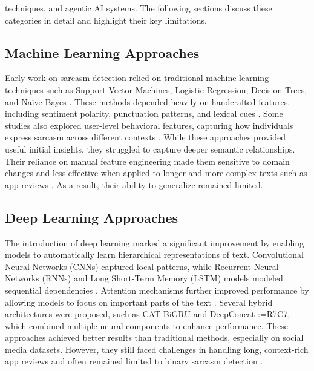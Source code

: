 \documentclass[a4paper,fleqn]{cas-sc}
\makeatletter
\newif\iftracked
\newcommand{\rv@recordone}[1]{%
  \edef\rv@i{#1}%
  \ifcsdef{rv@n@\rv@i}{}{\csgdef{rv@n@\rv@i}{0}}%
  \csxdef{rv@n@\rv@i}{\the\numexpr\csuse{rv@n@\rv@i}+1\relax}%
  \begingroup\edef\@currentlabel{\rv@i}\label{rv:\rv@i:\csuse{rv@n@\rv@i}}\endgroup}
\newcommand{\rv@record}[1]{\@for\rv@id:=#1\do{\expandafter\rv@recordone\expandafter{\rv@id}}}
\DeclareRobustCommand{\rce}[1]{\rv@record{R7C7}\iftracked{\color{rvEdit}#1}\else#1\fi}
\makeatother
\begin{document}
techniques, and agentic AI systems. The following sections discuss these categories in detail and highlight their key limitations.

\subsection{Machine Learning Approaches}
Early work on sarcasm detection relied on traditional machine learning techniques such as Support Vector Machines, Logistic Regression, Decision Trees, and Na\"ive Bayes \citep{rajadesingan2015sarcasm,sharma2026toward}. These methods depended heavily on handcrafted features, including sentiment polarity, punctuation patterns, and lexical cues \citep{reyes2013multidimensional,dina2026enhancing}. Some studies also explored user-level behavioral features, capturing how individuals express sarcasm across different contexts \citep{reyes2013multidimensional,pandey2026sarcasm}. While these approaches provided useful initial insights, they struggled to capture deeper semantic relationships. Their reliance on manual feature engineering made them sensitive to domain changes and less effective when applied to longer and more complex texts such as app reviews \citep{wang2026guard,awan2026efficient}. As a result, their ability to generalize remained limited.

\subsection{Deep Learning Approaches}
The introduction of deep learning marked a significant improvement by enabling models to automatically learn hierarchical representations of text. Convolutional Neural Networks (CNNs) captured local patterns, while Recurrent Neural Networks (RNNs) and Long Short-Term Memory (LSTM) models modeled sequential dependencies \citep{kamal2022cat,alzaidi2025applied,acharya2026comparative}. Attention mechanisms \citep{han2024agent} further improved performance by allowing models to focus on important parts of the text \citep{dao2022flashattention,dao2024flashattention2,awan2026efficient}. Several hybrid architectures were proposed, such as CAT-BiGRU \citep{kamal2022cat,zhang2026dual} and DeepConcat \citep{poria2016deeper}\rce{,} which combined multiple neural components to enhance performance. These approaches achieved better results than traditional methods, especially on social media datasets. However, they still faced challenges in handling long, context-rich app reviews and often remained limited to binary sarcasm detection \citep{putri2025sarcasm,acharya2026comparative,wang2026gan}.
\end{document}
